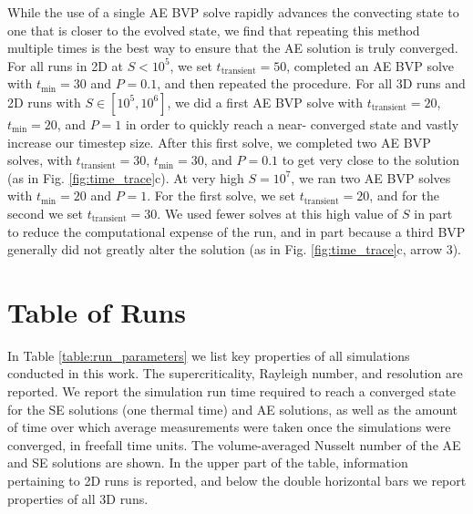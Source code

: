 \documentclass[aps, pre, onecolumn, nofootinbib, notitlepage, groupedaddress, amsfonts, amssymb, amsmath, longbibliography]{revtex4-1}
\begin{document}
While the use of a single AE BVP solve rapidly advances the convecting state to
one that is closer to the evolved state, we find that repeating this method 
multiple times is the best way to
ensure that the AE solution is truly converged. For all runs in 2D at $S < 10^5$, we
set $t_{\text{transient}} = 50$, completed an AE BVP solve
with $t_{\text{min}} = 30$ and $P = 0.1$, and then repeated the procedure.
For all 3D runs and 2D runs with $S \in [10^5, 10^6]$,
we did a first AE BVP solve with $t_{\text{transient}} = 20$,
$t_{\text{min}} = 20$, and $P = 1$ in order to quickly reach a near-
converged state and vastly increase our timestep size.  After this first solve, 
we completed two AE BVP solves, with $t_{\text{transient}} = 30$,
$t_{\text{min}} = 30$, 
and $P = 0.1$ to get very close to the solution (as in Fig. \ref{fig:time_trace}c).
At very high $S = 10^7$, we ran two AE BVP solves with $t_{\text{min}} = 20$ and
$P = 1$. For the first solve, we set $t_{\text{transient}} = 20$, and for the
second we set $t_{\text{transient}} = 30$. We used fewer solves at this high
value of $S$ in part to reduce the computational expense of the run, and in
part because a third BVP generally did not greatly alter the solution
(as in Fig. \ref{fig:time_trace}c, arrow 3).




\section{Table of Runs}
\label{appendix:run_table}
In Table \ref{table:run_parameters} we list key properties of all simulations
conducted in this work.  The supercriticality, Rayleigh number, and resolution
are reported.  We report the simulation run time required to reach a converged
state for the SE solutions (one thermal time)
and AE solutions, as well as the amount of time over which average measurements
were taken once the simulations were converged, in freefall time units.  The volume-averaged Nusselt number of the
AE and SE solutions are shown.
In the upper part of the table, information pertaining to 2D runs is reported,
and below the double horizontal bars we report properties of all
3D runs.
\end{document}
